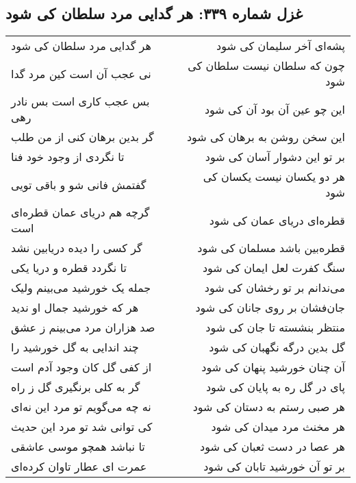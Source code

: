 \begin{center}
\section*{غزل شماره ۳۳۹: هر گدایی مرد سلطان کی شود}
\label{sec:339}
\begin{longtable}{l p{0.5cm} r}
هر گدایی مرد سلطان کی شود
&&
پشه‌ای آخر سلیمان کی شود
\\
نی عجب آن است کین مرد گدا
&&
چون که سلطان نیست سلطان کی شود
\\
بس عجب کاری است بس نادر رهی
&&
این چو عین آن بود آن کی شود
\\
گر بدین برهان کنی از من طلب
&&
این سخن روشن به برهان کی شود
\\
تا نگردی از وجود خود فنا
&&
بر تو این دشوار آسان کی شود
\\
گفتمش فانی شو و باقی تویی
&&
هر دو یکسان نیست یکسان کی شود
\\
گرچه هم دریای عمان قطره‌ای است
&&
قطره‌ای دریای عمان کی شود
\\
گر کسی را دیده دریابین نشد
&&
قطره‌بین باشد مسلمان کی شود
\\
تا نگردد قطره و دریا یکی
&&
سنگ کفرت لعل ایمان کی شود
\\
جمله یک خورشید می‌بینم ولیک
&&
می‌ندانم بر تو رخشان کی شود
\\
هر که خورشید جمال او ندید
&&
جان‌فشان بر روی جانان کی شود
\\
صد هزاران مرد می‌بینم ز عشق
&&
منتظر بنشسته تا جان کی شود
\\
چند اندایی به گل خورشید را
&&
گل بدین درگه نگهبان کی شود
\\
از کفی گل کان وجود آدم است
&&
آن چنان خورشید پنهان کی شود
\\
گر به کلی برنگیری گل ز راه
&&
پای در گل ره به پایان کی شود
\\
نه چه می‌گویم تو مرد این نه‌ای
&&
هر صبی رستم به دستان کی شود
\\
کی توانی شد تو مرد این حدیث
&&
هر مخنث مرد میدان کی شود
\\
تا نباشد همچو موسی عاشقی
&&
هر عصا در دست ثعبان کی شود
\\
عمرت ای عطار تاوان کرده‌ای
&&
بر تو آن خورشید تابان کی شود
\\
\end{longtable}
\end{center}
